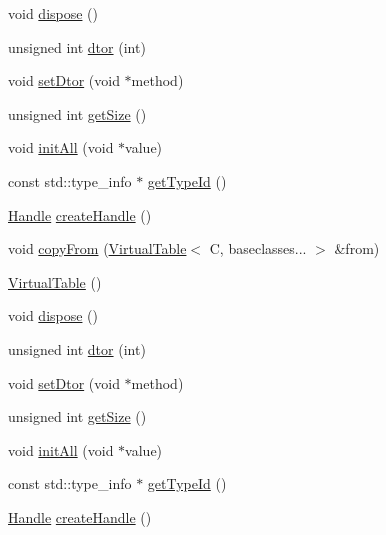 \begin{DoxyCompactItemize}
\item 
void \mbox{\hyperlink{structfakeit_1_1VirtualTable_a58c2bfa93deb68aba5eced688c168e66}{dispose}} ()
\item 
unsigned int \mbox{\hyperlink{structfakeit_1_1VirtualTable_a7be0619d713b6ae2cac5722895176a14}{dtor}} (int)
\item 
void \mbox{\hyperlink{structfakeit_1_1VirtualTable_adee13076280ff9bd4c06b5f1e62d6708}{set\+Dtor}} (void $\ast$method)
\item 
unsigned int \mbox{\hyperlink{structfakeit_1_1VirtualTable_a014d48c976f89207564bf8d68b64a039}{get\+Size}} ()
\item 
void \mbox{\hyperlink{structfakeit_1_1VirtualTable_a261b66b33067b4425791762cb3786f20}{init\+All}} (void $\ast$value)
\item 
const std\+::type\+\_\+info $\ast$ \mbox{\hyperlink{structfakeit_1_1VirtualTable_a5ed35b122d5d06afced80ab93062bfa3}{get\+Type\+Id}} ()
\item 
\mbox{\hyperlink{classfakeit_1_1VirtualTable_1_1Handle}{Handle}} \mbox{\hyperlink{structfakeit_1_1VirtualTable_a616ff0e7567c8c5f368faff1dca949df}{create\+Handle}} ()
\item 
void \mbox{\hyperlink{structfakeit_1_1VirtualTable_a79d7c3b29e6da1ba1974c8c9d69fd7bd}{copy\+From}} (\mbox{\hyperlink{structfakeit_1_1VirtualTable}{Virtual\+Table}}$<$ C, baseclasses... $>$ \&from)
\item 
\mbox{\hyperlink{structfakeit_1_1VirtualTable_ae64da18818c25b107d8f9f2c615c4c37}{Virtual\+Table}} ()
\item 
void \mbox{\hyperlink{structfakeit_1_1VirtualTable_a58c2bfa93deb68aba5eced688c168e66}{dispose}} ()
\item 
unsigned int \mbox{\hyperlink{structfakeit_1_1VirtualTable_a7be0619d713b6ae2cac5722895176a14}{dtor}} (int)
\item 
void \mbox{\hyperlink{structfakeit_1_1VirtualTable_adee13076280ff9bd4c06b5f1e62d6708}{set\+Dtor}} (void $\ast$method)
\item 
unsigned int \mbox{\hyperlink{structfakeit_1_1VirtualTable_a014d48c976f89207564bf8d68b64a039}{get\+Size}} ()
\item 
void \mbox{\hyperlink{structfakeit_1_1VirtualTable_a261b66b33067b4425791762cb3786f20}{init\+All}} (void $\ast$value)
\item 
const std\+::type\+\_\+info $\ast$ \mbox{\hyperlink{structfakeit_1_1VirtualTable_a5ed35b122d5d06afced80ab93062bfa3}{get\+Type\+Id}} ()
\item 
\mbox{\hyperlink{classfakeit_1_1VirtualTable_1_1Handle}{Handle}} \mbox{\hyperlink{structfakeit_1_1VirtualTable_a616ff0e7567c8c5f368faff1dca949df}{create\+Handle}} ()

\end{DoxyCompactItemize}
